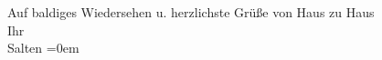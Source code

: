 \pstart
           Auf baldiges Wiedersehen u. herzlichste Grüße von Haus zu Haus {\\[\baselineskip]}Ihr {\\[\baselineskip]}\spacefill\mbox{Salten}\pend
           \leftskip=0em{}\endnumbering{}  \newcommand{\dateiname}{L03555}\newcommand{\titel}{Felix Salten an Arthur Schnitzler, [26. 1. 1912]}\newcommand{\editorInnen}{Martin Anton Müller und Laura Untner}

